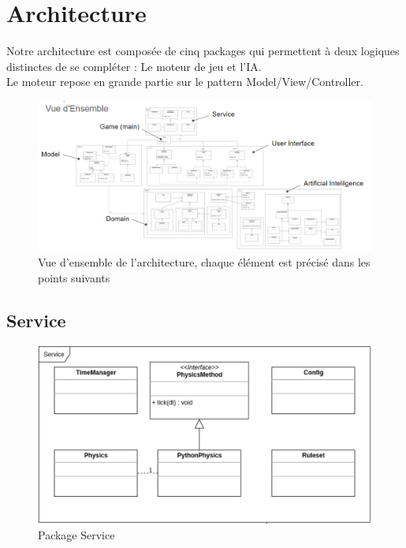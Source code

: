 \section{Architecture}

Notre architecture est composée de cinq packages qui permettent à deux logiques distinctes de se compléter : Le moteur de jeu et l'IA.\\

Le moteur repose en grande partie sur le pattern Model/View/Controller.\\


\begin{figure}[H]
    \centering
    \includegraphics[scale=0.52,angle=90]{data/archi/vue_ensemble.png}{}
    \caption{Vue d'ensemble de l'architecture, chaque élément est précisé dans les points suivants}
\end{figure}

\clearpage
\subsection{Service}

\begin{figure}[H]
    \centering
    \includegraphics[scale=0.55]{data/archi/service.png}
    \caption{Package Service}
\end{figure}

